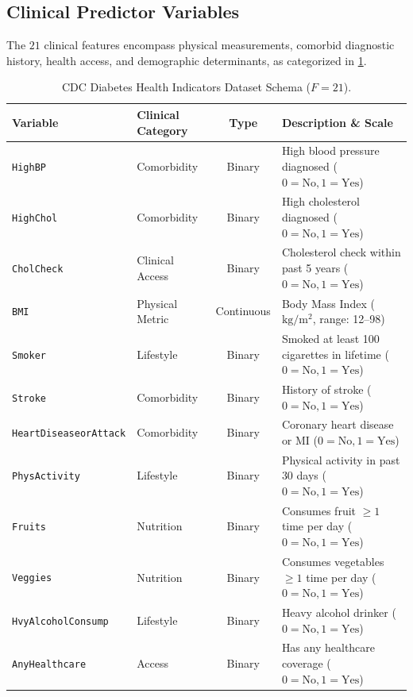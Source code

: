 \documentclass[11pt,a4paper]{report}
\begin{document}
\subsection{Clinical Predictor Variables}
The $21$ clinical features encompass physical measurements, comorbid diagnostic history, health access, and demographic determinants, as categorized in \cref{tab:feature_definitions}.

\begin{table}[htbp]
  \centering
  \small
  \caption{CDC Diabetes Health Indicators Dataset Schema ($F=21$).}
  \label{tab:feature_definitions}
  \begin{tabularx}{\textwidth}{llcX}
    \toprule
    \textbf{Variable} & \textbf{Clinical Category} & \textbf{Type} & \textbf{Description \& Scale} \\
    \midrule
    \texttt{HighBP} & Comorbidity & Binary & High blood pressure diagnosed ($0=\text{No}, 1=\text{Yes}$) \\
    \texttt{HighChol} & Comorbidity & Binary & High cholesterol diagnosed ($0=\text{No}, 1=\text{Yes}$) \\
    \texttt{CholCheck} & Clinical Access & Binary & Cholesterol check within past 5 years ($0=\text{No}, 1=\text{Yes}$) \\
    \texttt{BMI} & Physical Metric & Continuous & Body Mass Index ($\text{kg}/\text{m}^2$, range: 12--98) \\
    \texttt{Smoker} & Lifestyle & Binary & Smoked at least 100 cigarettes in lifetime ($0=\text{No}, 1=\text{Yes}$) \\
    \texttt{Stroke} & Comorbidity & Binary & History of stroke ($0=\text{No}, 1=\text{Yes}$) \\
    \texttt{HeartDiseaseorAttack} & Comorbidity & Binary & Coronary heart disease or MI ($0=\text{No}, 1=\text{Yes}$) \\
    \texttt{PhysActivity} & Lifestyle & Binary & Physical activity in past 30 days ($0=\text{No}, 1=\text{Yes}$) \\
    \texttt{Fruits} & Nutrition & Binary & Consumes fruit $\ge 1$ time per day ($0=\text{No}, 1=\text{Yes}$) \\
    \texttt{Veggies} & Nutrition & Binary & Consumes vegetables $\ge 1$ time per day ($0=\text{No}, 1=\text{Yes}$) \\
    \texttt{HvyAlcoholConsump} & Lifestyle & Binary & Heavy alcohol drinker ($0=\text{No}, 1=\text{Yes}$) \\
    \texttt{AnyHealthcare} & Access & Binary & Has any healthcare coverage ($0=\text{No}, 1=\text{Yes}$) \\

\end{tabularx}
\end{table}
\end{document}
